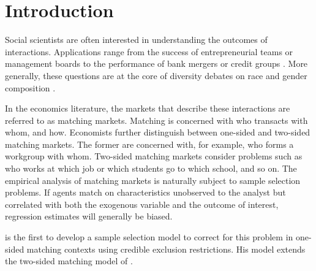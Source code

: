 \section{Introduction}

Social scientists are often interested in understanding the outcomes of interactions. Applications range from the success of entrepreneurial teams or management boards \citep{Hoogendoorn2013} to the performance of bank mergers or credit groups \citep{Klein2015a}. More generally, these questions are at the core of  diversity debates on race and gender composition \citep{Herring2009}. %

In the economics literature, the markets that describe these interactions are referred to as matching markets. Matching is concerned with who transacts with whom, and how. Economists further distinguish between one-sided and two-sided matching markets. The former are concerned with, for example, who forms a workgroup with whom. Two-sided matching markets consider problems such as who works at which job or which students go to which school, and so on. The empirical analysis of matching markets is naturally subject to sample selection problems. If agents match on characteristics unobserved to the analyst but correlated with both the exogenous variable and the outcome of interest, regression estimates will generally be biased.

\citet{Klein2015a} is the first to develop a sample selection model to correct for this problem in one-sided matching contexts using credible exclusion restrictions. His model extends the two-sided matching model of \citet{Sorensen2007}.

